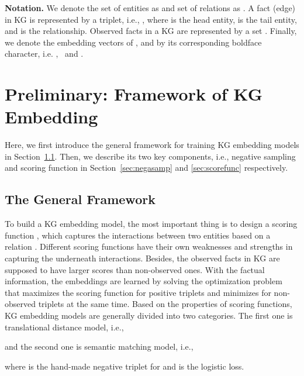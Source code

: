 \documentclass[conference]{IEEEtran}
\begin{document}
\noindent
\textbf{Notation.}
We denote the set of entities as  and set of relations as .  
A fact (edge) in KG is represented by a triplet,
i.e., ,
where  is the head entity,
 is the tail entity,
and  is the relationship.
Observed facts in a KG are represented by a set .
Finally,
we denote the embedding vectors of ,  and  by its corresponding boldface character, 
i.e. ,~ and .  




\section{Preliminary:
Framework of KG Embedding}
\label{sec-prelim}





Here,
we first introduce the general framework 
for training KG embedding models in Section~\ref{sec:uniframe}.
Then,
we describe its two key components,
i.e., 
negative sampling and scoring function
in Section~\ref{sec:negasamp} and \ref{sec:scorefunc} respectively.

\subsection{The General Framework}
\label{sec:uniframe}






To build a KG embedding model,
the most important thing is to design a scoring function ,
which captures the interactions between two entities based on a relation \cite{wang2017knowledge}.
Different scoring functions have their own weaknesses and strengths in capturing the underneath interactions.
{
Besides,
the observed facts in KG are supposed to have larger scores than non-observed ones. 
With the factual information, 
the embeddings are learned by solving the optimization problem that maximizes 
the scoring function for positive triplets and minimizes for non-observed triplets
at the same time.
}
Based on the properties of scoring functions,
KG embedding models are generally divided into two categories.
The first one is translational distance model, i.e.,

and the second one is semantic matching model, i.e.,

where
 is the hand-made negative triplet for  and
 is the logistic loss.
\end{document}
